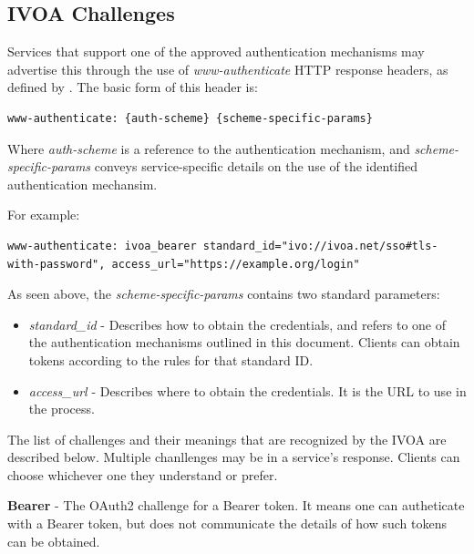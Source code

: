 \documentclass[11pt,a4paper]{ivoa}
\begin{document}
\subsection{IVOA Challenges}

Services that support one of the approved authentication mechanisms may advertise this through the use of \emph{www-authenticate} HTTP response headers, as defined by \citep{std:RFC7235}. The basic form of this header is:

\begin{verbatim}
www-authenticate: {auth-scheme} {scheme-specific-params}
\end{verbatim}

Where \emph{auth-scheme} is a reference to the authentication mechanism, and \emph{scheme-specific-params} conveys service-specific details on the use of the identified authentication mechansim.

For example:

\begin{verbatim}
www-authenticate: ivoa_bearer standard_id="ivo://ivoa.net/sso#tls-with-password", access_url="https://example.org/login"
\end{verbatim}

As seen above, the \emph{scheme-specific-params} contains two standard parameters:

\begin{itemize}
\item{\emph{standard\_id}} - Describes how to obtain the credentials, and refers to one of the authentication mechanisms outlined in this document. Clients can obtain tokens according to the rules for that standard ID.
\item{\emph{access\_url}} - Describes where to obtain the credentials.  It is the URL to use in the process.
\end{itemize}

The list of challenges and their meanings that are recognized by the IVOA are described below. Multiple chanllenges may be in a service's response. Clients can choose whichever one they understand or prefer.

\textbf{Bearer} - The OAuth2 \citep{std:RFC6749} challenge for a Bearer token. It means one can autheticate with a Bearer token, but does not communicate the details of how such tokens can be obtained.
\end{document}
